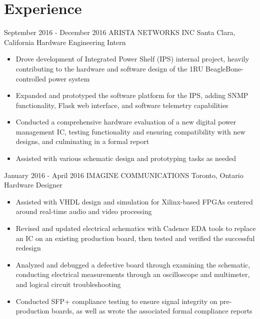 \documentclass[hidelinks]{kkurucz-cv}
\begin{document}
\vspace{-4.5mm}
\begin{minipage}{\textwidth}
\section{Experience}

\vspace{1mm}
\begin{entrylist}
\entry
{September 2016 - December 2016}
{ARISTA NETWORKS INC}
{Santa Clara, California}
{Hardware Engineering Intern}
{
\begin{itemize}
	\item Drove development of Integrated Power Shelf (IPS) internal project, heavily contributing to the hardware and software design of the 1RU BeagleBone-controlled power system
	\item Expanded and prototyped the software platform for the IPS, adding SNMP functionality, Flask web interface, and software telemetry capabilities
	\item Conducted a comprehensive hardware evaluation of a new digital power management IC, testing functionality and ensuring compatibility with new designs, and culminating in a formal report
	\item Assisted with various schematic design and prototyping tasks as needed
\end{itemize}
}

\entry
{January 2016 - April 2016}
{IMAGINE COMMUNICATIONS}
{Toronto, Ontario}
{Hardware Designer}
{
\begin{itemize}
	\item Assisted with VHDL design and simulation for Xilinx-based FPGAs centered around real-time audio and video processing
	\item Revised and updated electrical schematics with Cadence EDA tools to replace an IC on an existing production board, then tested and verified the successful redesign
	\item Analyzed and debugged a defective board through examining the schematic, conducting electrical measurements through an oscilloscope and multimeter, and logical circuit troubleshooting
	\item Conducted SFP+ compliance testing to ensure signal integrity on pre-production boards, as well as wrote the associated formal compliance reports
\end{itemize}
}


\end{entrylist}
\end{minipage}
\end{document}
